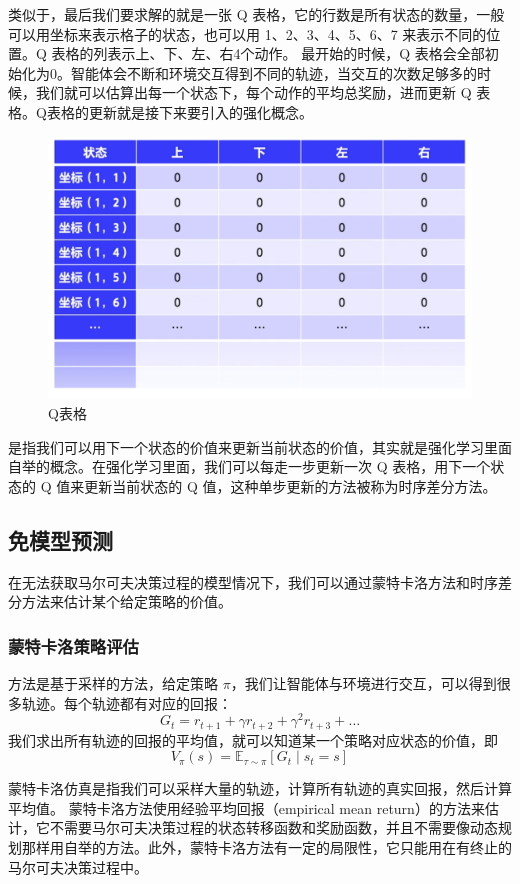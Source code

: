 类似于，最后我们要求解的就是一张 Q 表格，它的行数是所有状态的数量，一般可以用坐标来表示格子的状态，也可以用 1、2、3、4、5、6、7 来表示不同的位置。Q 表格的列表示上、下、左、右4个动作。
最开始的时候，Q 表格会全部初始化为0。智能体会不断和环境交互得到不同的轨迹，当交互的次数足够多的时候，我们就可以估算出每一个状态下，每个动作的平均总奖励，进而更新 Q  表格。Q表格的更新就是接下来要引入的强化概念。

\begin{figure}[htb]
	\centering
	\includegraphics[width=0.4\linewidth]{res/ch3/3.9}
	\caption{Q表格}
	\label{fig:fig3.9}
\end{figure}

是指我们可以用下一个状态的价值来更新当前状态的价值，其实就是强化学习里面自举的概念。在强化学习里面，我们可以每走一步更新一次 Q 表格，用下一个状态的 Q 值来更新当前状态的 Q 值，这种单步更新的方法被称为时序差分方法。

\subsection{免模型预测} 

在无法获取马尔可夫决策过程的模型情况下，我们可以通过蒙特卡洛方法和时序差分方法来估计某个给定策略的价值。

\subsubsection{蒙特卡洛策略评估}
	方法是基于采样的方法，给定策略 $\pi$，我们让智能体与环境进行交互，可以得到很多轨迹。每个轨迹都有对应的回报：
	\begin{equation}
		G_{t}=r_{t+1}+\gamma r_{t+2}+\gamma^{2} r_{t+3}+\ldots
		\label{eq:}
	\end{equation}
	我们求出所有轨迹的回报的平均值，就可以知道某一个策略对应状态的价值，即 
	\begin{equation}
		\label{eq:}
		V_{\pi}(s)=\mathbb{E}_{\tau \sim \pi}\left[G_{t} \mid  s_{t}=s\right]
	\end{equation}
	
	蒙特卡洛仿真是指我们可以采样大量的轨迹，计算所有轨迹的真实回报，然后计算平均值。
	蒙特卡洛方法使用经验平均回报（empirical mean return）的方法来估计，它不需要马尔可夫决策过程的状态转移函数和奖励函数，并且不需要像动态规划那样用自举的方法。此外，蒙特卡洛方法有一定的局限性，它只能用在有终止的马尔可夫决策过程中。


